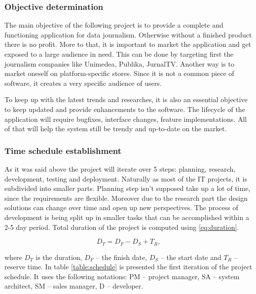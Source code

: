 \subsubsection{Objective determination}
The main objective of the following project is to provide a complete and functioning application for data journalism. Otherwise without a finished product there is no profit. More to that, it is important to market the application and get exposed to a large audience in need. This can be done by targeting first the journalism companies like Unimedea, Publika, JurnalTV. Another way is to market oneself on platform-specific stores. Since it is not a common piece of software, it creates a very specific audience of users. 

To keep up with the latest trends and researches, it is also an essential objective to keep updated and provide enhancements to the software. The lifecycle of the application will require bugfixes, interface changes, feature implementations. All of that will help the system still be trendy and up-to-date on the market.

\subsubsection{Time schedule establishment}
As it was said above the project will iterate over 5 steps: planning, research, development, testing and deployment. Naturally as most of the IT projects, it is subdivided into smaller parts. Planning step isn't supposed take up a lot of time, since the requirements are flexible. Moreover due to the research part the design solutions can change over time and open up new perspectives. The process of development is being split up in smaller tasks that can be accomplished within a 2-5 day period. Total duration of the project is computed using \eqref{eq:duration}.

\begin{equation} \label{eq:duration}
 D_T = D_F - D_S + T_R,
\end{equation}

\noindent
where $D_T$ is the duration, $D_F$ -- the finish date, $D_S$ -- the start date and $T_R$ -- reserve time. In table \ref{table:schedule} is presented the first iteration of the project schedule. It uses the following notations: PM -- project manager, SA -- system architect, SM -- sales manager, D -- developer.

